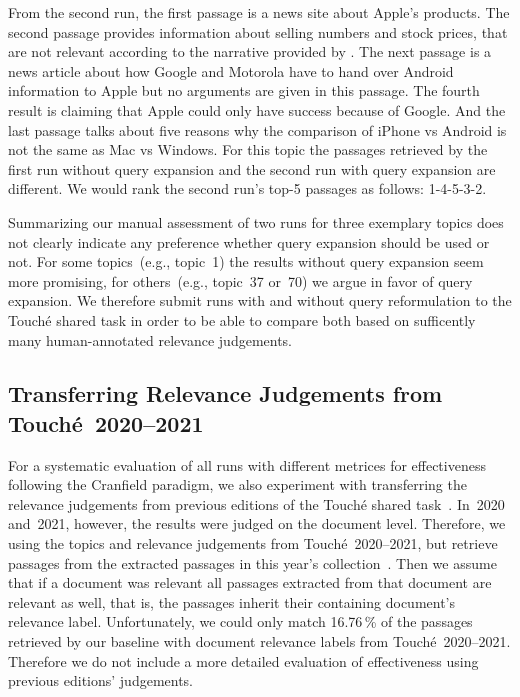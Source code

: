 From the second run, the first passage is a news site about Apple's products.
The second passage provides information about selling numbers and stock prices, that are not relevant according to the narrative provided by \citet{BondarenkoFKSGBPBSWPH2022}.
The next passage is a news article about how Google and Motorola have to hand over Android information to Apple but no arguments are given in this passage.
The fourth result is claiming that Apple could only have success because of Google.
And the last passage talks about five reasons why the comparison of iPhone vs Android is not the same as Mac vs Windows.
For this topic the passages retrieved by the first run without query expansion and the second run with query expansion are different.
We would rank the second run's top-5 passages as follows: 1-4-5-3-2.

Summarizing our manual assessment of two runs for three exemplary topics does not clearly indicate any preference whether query expansion should be used or not.
For some topics~(e.g., topic~1) the results without query expansion seem more promising, for others~(e.g., topic~37 or~70) we argue in favor of query expansion.
We therefore submit runs with and without query reformulation to the Touché shared task in order to be able to compare both based on sufficently many human-annotated relevance judgements.

\subsection{Transferring Relevance Judgements from Touché~2020--2021}
\label{transfer-relevance-judgements}

For a systematic evaluation of all runs with different metrices for effectiveness following the Cranfield paradigm, we also experiment with transferring the relevance judgements from previous editions of the Touché shared task~\cite{BondarenkoFBGAPBSWPH2020,BondarenkoGFBAPBSWPH2021}.
In~2020 and~2021, however, the results were judged on the document level.
Therefore, we using the topics and relevance judgements from Touché~2020--2021, but retrieve passages from the extracted passages in this year's collection~\cite{BondarenkoFKSGBPBSWPH2022}.
Then we assume that if a document was relevant all passages extracted from that document are relevant as well, that is, the passages inherit their containing document's relevance label.
Unfortunately, we could only match 16.76\,\% of the passages retrieved by our baseline with document relevance labels from Touché~2020--2021.
Therefore we do not include a more detailed evaluation of effectiveness using previous editions' judgements.
